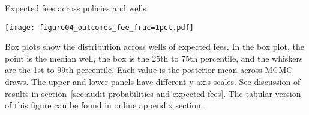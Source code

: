 \caption{Expected fees across policies and wells}

\label{fig:expected-fee-1pct}

\texttt{[image: figure04\_outcomes\_fee\_frac=1pct.pdf]}

Box plots show the distribution across wells of expected fees.
In the box plot, the point is the median well, the box is the 25th to 75th percentile, and the whiskers are the 1st to 99th percentile.
Each value is the posterior mean across \gls{MCMC} draws.
The upper and lower panels have different y-axis scales.
See discussion of results in section~\ref{sec:audit-probabilities-and-expected-fees}.
The tabular version of this figure can be found in online appendix section~\iftoggle{usexr}{\ref{app:tabular-policy-output}}{A4}.
